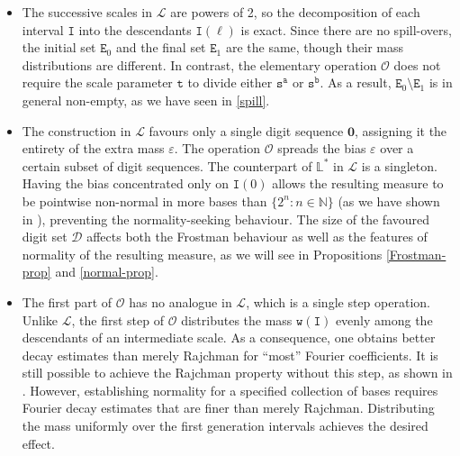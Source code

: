 \documentclass[12pt, twoside]{article}
\theoremstyle{definition}
\numberwithin{equation}{section}
\begin{document}
\begin{itemize} 
\item The successive scales in $\mathscr{L}$ are powers of 2, so the decomposition of each interval $\mathtt I$ into the descendants $\mathtt I(\ell)$ is exact. Since there are no spill-overs, the initial set $\mathtt E_0$ and the final set $\mathtt E_1$ are the same, though their mass distributions are different. In contrast, the elementary operation $\mathscr{O}$ does not require the scale parameter $\mathtt t$ to divide either $\mathtt s^{\mathtt a}$ or $\mathtt s^{\mathtt b}$. As a result, $\mathtt E_0 \setminus \mathtt E_1$ is in general non-empty, as we have seen in \eqref{spill}. 

\item The construction in $\mathscr{L}$ favours only a single digit sequence $\mathbf 0$, assigning it the entirety of the extra mass $\varepsilon$. The operation $\mathscr{O}$ spreads the bias $\varepsilon$ over a certain subset of digit sequences. The counterpart of $\mathbb L^{\ast}$ in $\mathscr{L}$ is a singleton. Having the bias concentrated only on $\mathtt I(0)$ allows the resulting measure to be pointwise non-normal in more bases than $\{2^n : n \in \mathbb N\}$ (as we have shown in \cite{PZ-1}), preventing the normality-seeking behaviour.  The size of the favoured digit set $\mathscr{D}$ affects both the Frostman behaviour as well as the features of normality of the resulting measure, as we will see in Propositions \ref{Frostman-prop} and \ref{normal-prop}. 

\item The first part of $\mathscr{O}$ has no analogue in $\mathscr{L}$, which is a single step operation. Unlike $\mathscr{L}$, the first step of $\mathscr{O}$ distributes the mass $\mathtt w(\mathtt I)$ evenly among the descendants of an intermediate scale. As a consequence, one obtains better decay estimates than merely Rajchman for ``most'' Fourier coefficients. It is still possible to achieve the Rajchman property without this step, as shown in \cite{l86}. However, establishing normality for a specified collection of bases requires Fourier decay estimates that are finer than merely Rajchman. Distributing the mass uniformly over the first generation intervals achieves the desired effect. 
\end{itemize} 
\end{document}
